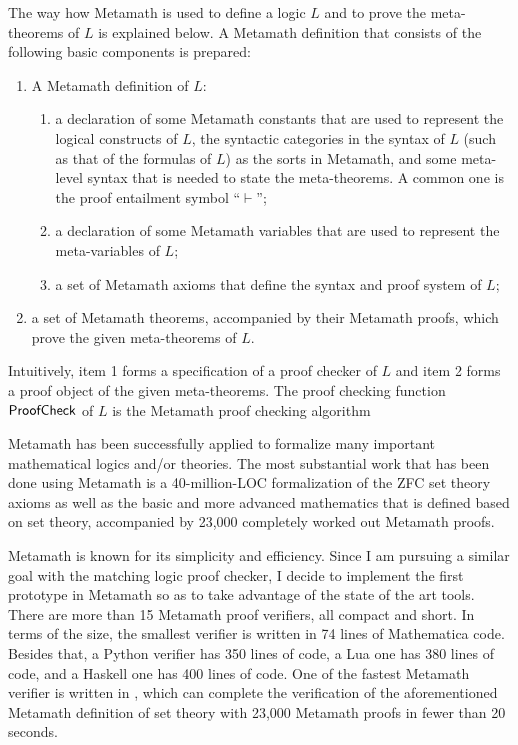 \documentclass[11pt]{article}
\begin{document}
The way how Metamath is used to define a logic $L$ and to prove the meta-theorems of $L$ is explained below. 
A Metamath definition that consists of the following basic components is prepared:
\begin{enumerate}
\item A Metamath definition of $L$:
\begin{enumerate}
\item a declaration of some Metamath constants that are used to represent the 
logical constructs of $L$, the syntactic categories in the syntax of $L$
(such as that of the formulas of $L$) as the sorts in Metamath,
and some meta-level syntax that is needed to state the meta-theorems. A common one is the proof entailment symbol ``$\vdash$'';
\item a declaration of some Metamath variables that are used to represent the meta-variables of $L$;
\item a set of Metamath axioms that define the syntax and proof system of $L$;
\end{enumerate}
\item a set of Metamath theorems, accompanied by their Metamath proofs, which prove the given meta-theorems of $L$.
\end{enumerate}
Intuitively, item 1 forms a specification of a proof checker of $L$ and item 2 forms
a proof object of the given meta-theorems. 
The proof checking function $\mathsf{ProofCheck}$ of $L$ is the Metamath proof checking algorithm

Metamath has been successfully applied to formalize many important mathematical logics and/or theories. 
The most substantial work that has been done using Metamath
is a 40-million-LOC formalization of the ZFC set theory axioms
as well as the basic and more advanced mathematics that is defined based on set 
theory, accompanied by 23,000 completely worked out Metamath proofs. 

Metamath is known for its simplicity and efficiency.
Since I am pursuing a similar goal with the matching logic proof checker, I decide to implement the first prototype in Metamath so as to take advantage of the state of the art tools. 
There are more than 15 Metamath proof verifiers, all compact and short. 
In terms of the size, 
the smallest verifier is written in 74 lines of Mathematica code.
Besides that, a Python verifier has 350 lines of code,
a Lua one has 380 lines of code, and a Haskell one has 400 lines of code.
One of the fastest Metamath verifier is written in \Cpp, which can complete the verification of the aforementioned Metamath definition of set theory with 23,000 Metamath proofs in fewer than 20 seconds. 
\end{document}
